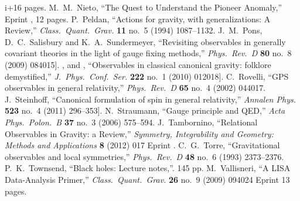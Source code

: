 \begin{thebibliography}{99}
  i+16 pages.
  M.~M.~Nieto,\newblock
  ``The Quest to Understand the Pioneer Anomaly,''\newblock
  Eprint , 12 pages.
  P.~Peldan,\newblock
  ``Actions for gravity, with generalizations: A Review,''\newblock
  \emph{Class.\ Quant.\ Grav.} {\bf 11} no.~5 (1994) 1087--1132\newblock
  [\arXiv{gr-qc/9305011}].
  J.~M.~Pons, D.~C.~Salisbury and K.~A.~Sundermeyer,\newblock
  ``Revisiting observables in generally covariant theories in the light of gauge fixing methods,''\newblock
  \emph{Phys.\ Rev.\ D} {\bf 80} no.~8 (2009) 084015\newblock
  [\arXiv[gr-qc]{0905.4564}].
  \bysame, \bysame and \bysame,\newblock
  ``Observables in classical canonical gravity: folklore demystified,''\newblock
  \emph{J.\ Phys.\ Conf.\ Ser.} {\bf 222} no.~1 (2010) 012018\newblock
  [\arXiv[gr-qc]{1001.2726}].
  C.~Rovelli,\newblock
  ``GPS observables in general relativity,''\newblock
  \emph{Phys.\ Rev.\ D} {\bf 65} no.~4 (2002) 044017\newblock
  [\arXiv{gr-qc/0110003}].
  J.~Steinhoff,\newblock
  ``Canonical formulation of spin in general relativity,''\newblock
  \emph{Annalen Phys.} {\bf 523} no.~4 (2011) 296--353\newblock
  [\arXiv[gr-qc]{1106.4203}].
  N.~Straumann,\newblock
  ``Gauge principle and QED,''\newblock
  \emph{Acta Phys.\ Polon.\ B} {\bf 37} no.~3 (2006) 575--594.
  J.~Tambornino,\newblock
  ``Relational Observables in Gravity: a Review,''\newblock
  \emph{Symmetry, Integrability and Geometry: Methods and Applications} \textbf{8} (2012) 017\newblock
  Eprint .
  C.~G.~Torre,\newblock
  ``Gravitational observables and local symmetries,''\newblock
  \emph{Phys.\ Rev.\ D} {\bf 48} no.~6 (1993) 2373--2376\newblock
  [\arXiv{gr-qc/9306030}].
  P.~K.~Townsend,\newblock
  ``Black holes: Lecture notes,''\newblock
  [\arXiv{gr-qc/9707012}]. 145 pp.
  M.~Vallisneri,\newblock
  ``A LISA Data-Analysis Primer,''\newblock
  \emph{Class.\ Quant.\ Grav.} {\bf 26} no.~9 (2009) 094024\newblock
  Eprint  13 pages.

\end{thebibliography}
